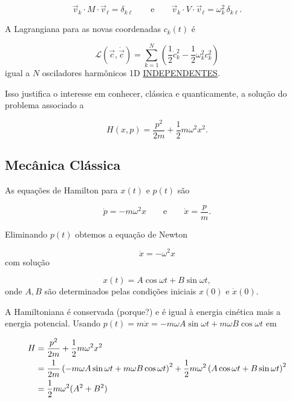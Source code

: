 \begin{equation}
    \vec{v}_k \cdot M \cdot \vec{v}_\ell = \delta_{k\ell} \qquad \text{e} \qquad \vec{v}_k \cdot V \cdot \vec{v}_\ell = \omega_k^2\,\delta_{k\ell}.
\label{eq:aula16_ortonormalizacao}
\end{equation}

A Lagrangiana para as novas coordenadas $c_k(t)$ é

\begin{equation}
    \mathcal{L}(\vec{c}, \dot{\vec{c}}) = \sum_{k=1}^{N} \left( \frac{1}{2}\dot{c}_k^2 - \frac{1}{2}\omega_k^2 c_k^2 \right)
\label{eq:aula16_lagrangiana_ck}
\end{equation}
igual a $N$ osciladores harmônicos 1D \underline{INDEPENDENTES}.

Isso justifica o interesse em conhecer, clássica e quanticamente, a solução do problema associado a

\begin{equation}
    H(x,p) = \frac{p^2}{2m} + \frac{1}{2}m\omega^2 x^2 .
\label{eq:aula16_H_problema_basico}
\end{equation}

\subsection*{Mecânica Clássica}

As equações de Hamilton para $x(t)$ e $p(t)$ são

\begin{equation}
    \dot{p} = -m\omega^2 x \qquad \text{e} \qquad \dot{x} = \frac{p}{m}.
\label{eq:aula16_eqs_hamilton_oh}
\end{equation}

Eliminando $p(t)$ obtemos a equação de Newton

\begin{equation}
    \ddot{x} = -\omega^2 x
\label{eq:aula16_newton}
\end{equation}
com solução

\begin{equation}
    x(t) = A\cos\omega t + B \sin\omega t,
\label{eq:aula16_solucao_classica}
\end{equation}
onde $A, B$ são determinados pelas condições iniciais $x(0)$ e $\dot{x}(0)$.

A Hamiltoniana é conservada (porque?) e é igual à energia cinética mais a energia potencial. Usando $p(t) = m\dot{x} = -m\omega A \sin\omega t + m\omega B\cos\omega t$ em

\begin{align}
    H &= \frac{p^2}{2m} + \frac{1}{2}m\omega^2 x^2 \notag \\
    &= \frac{1}{2m}\left(-m\omega A\sin\omega t + m\omega B \cos\omega t\right)^2 + \frac{1}{2}m\omega^2\left(A\cos\omega t + B \sin\omega t\right)^2 \notag \\
    &= \frac{1}{2}m\omega^2 (A^2 + B^2)
\label{eq:aula16_H_classica_AB}
\end{align}

